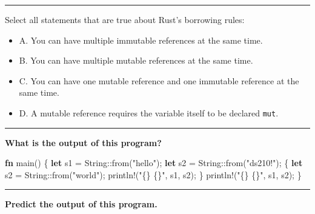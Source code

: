 \documentclass[
  11pt,
]{article}
\newenvironment{Shaded}{}{}
\newcommand{\DataTypeTok}[1]{\textcolor[rgb]{0.56,0.13,0.00}{#1}}
\newcommand{\KeywordTok}[1]{\textcolor[rgb]{0.00,0.44,0.13}{\textbf{#1}}}
\newcommand{\NormalTok}[1]{#1}
\newcommand{\OperatorTok}[1]{\textcolor[rgb]{0.40,0.40,0.40}{#1}}
\newcommand{\PreprocessorTok}[1]{\textcolor[rgb]{0.74,0.48,0.00}{#1}}
\newcommand{\StringTok}[1]{\textcolor[rgb]{0.25,0.44,0.63}{#1}}
\providecommand{\tightlist}{%
  \setlength{\itemsep}{0pt}\setlength{\parskip}{0pt}}
\begin{document}
\begin{center}\rule{0.5\linewidth}{0.5pt}\end{center}

Select all statements that are true about Rust's borrowing rules:

\begin{itemize}
\tightlist
\item[$\square$]
  A. You can have multiple immutable references at the same time.
\item[$\square$]
  B. You can have multiple mutable references at the same time.
\item[$\square$]
  C. You can have one mutable reference and one immutable reference at
  the same time.
\item[$\square$]
  D. A mutable reference requires the variable itself to be declared
  \texttt{mut}.
\end{itemize}

\begin{center}\rule{0.5\linewidth}{0.5pt}\end{center}

\textbf{What is the output of this program?}

\begin{Shaded}
\begin{Highlighting}[]
\KeywordTok{fn}\NormalTok{ main() }\OperatorTok{\{}
    \KeywordTok{let}\NormalTok{ s1 }\OperatorTok{=} \DataTypeTok{String}\PreprocessorTok{::}\NormalTok{from(}\StringTok{"hello"}\NormalTok{)}\OperatorTok{;}
    \KeywordTok{let}\NormalTok{ s2 }\OperatorTok{=} \DataTypeTok{String}\PreprocessorTok{::}\NormalTok{from(}\StringTok{"ds210!"}\NormalTok{)}\OperatorTok{;}
    \OperatorTok{\{}
        \KeywordTok{let}\NormalTok{ s2 }\OperatorTok{=} \DataTypeTok{String}\PreprocessorTok{::}\NormalTok{from(}\StringTok{"world"}\NormalTok{)}\OperatorTok{;}
        \PreprocessorTok{println!}\NormalTok{(}\StringTok{"\{\} \{\}"}\OperatorTok{,}\NormalTok{ s1}\OperatorTok{,}\NormalTok{ s2)}\OperatorTok{;}
    \OperatorTok{\}}
    \PreprocessorTok{println!}\NormalTok{(}\StringTok{"\{\} \{\}"}\OperatorTok{,}\NormalTok{ s1}\OperatorTok{,}\NormalTok{ s2)}\OperatorTok{;}
\OperatorTok{\}}
\end{Highlighting}
\end{Shaded}

\begin{center}\rule{0.5\linewidth}{0.5pt}\end{center}

\textbf{Predict the output of this program.}
\end{document}

